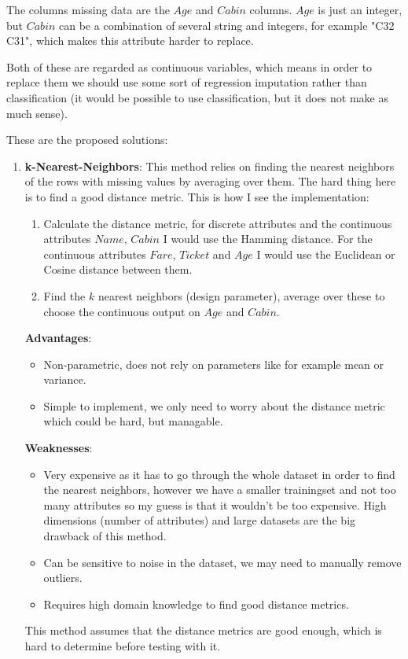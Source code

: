 \documentclass[11pt, english]{../Template/NTNUoving}
\begin{document}
\begin{oppgave}

    The columns missing data are the $Age$ and $Cabin$ columns.
    $Age$ is just an integer, but $Cabin$ can be a combination of several
    string and integers, for example "C32 C31", which makes this attribute harder to replace.

    Both of these are regarded as continuous variables, which means in order to replace them we should use some sort of
    regression imputation rather than classification (it would be possible to use classification, but it does not make as much sense).

    These are the proposed solutions:

    \begin{enumerate}

        \item \textbf{k-Nearest-Neighbors}\cite{knn}: This method relies on finding the nearest neighbors of the rows with missing values by averaging over them. The hard thing here is to find a good distance metric.
        This is how I see the implementation:
        \begin{enumerate}[label=\arabic*]
            \item Calculate the distance metric, for discrete attributes and the continuous attributes $Name$, $Cabin$ I would use the Hamming distance\cite{hamming}. For the continuous attributes $Fare$, $Ticket$ and $Age$ I would use the Euclidean or Cosine distance between them.
            \item Find the $k$ nearest neighbors (design parameter), average over these to choose the continuous output on $Age$ and $Cabin$.
        \end{enumerate}
        \textbf{Advantages}:
        \begin{itemize}
            \item Non-parametric, does not rely on parameters like for example mean or variance.
            \item Simple to implement, we only need to worry about the distance metric which could be hard, but managable.
        \end{itemize}
        \textbf{Weaknesses}:
        \begin{itemize}
            \item Very expensive as it has to go through the whole dataset in order to find the nearest neighbors, however we have a smaller trainingset and not too many attributes so my guess is that it wouldn't be too expensive.
            High dimensions (number of attributes) and large datasets are the big drawback of this method.
            \item Can be sensitive to noise in the dataset, we may need to manually remove outliers.
            \item Requires high domain knowledge to find good distance metrics.
        \end{itemize}
        This method assumes that the distance metrics are good enough, which is hard to determine before testing with it.


\end{enumerate}
\end{oppgave}
\end{document}
